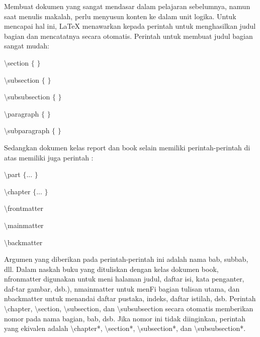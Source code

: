 Membuat dokumen yang sangat mendasar dalam pelajaran sebelumnya, namun saat menulis makalah, perlu menyusun konten ke dalam unit logika. Untuk mencapai hal ini, LaTeX menawarkan kepada perintah untuk menghasilkan judul bagian dan mencatatnya secara otomatis. Perintah untuk membuat judul bagian sangat mudah: \par
{\fontsize{10pt}{10pt}\selectfont  $  \setminus  $section $  \{  $ $  \}  $}
 \par
{\fontsize{10pt}{10pt}\selectfont  $  \setminus  $subsection $  \{  $ $  \}  $}
 \par
{\fontsize{10pt}{10pt}\selectfont  $  \setminus  $subsubsection $  \{  $ $  \}  $}
 \par
{\fontsize{10pt}{10pt}\selectfont  $  \setminus  $paragraph $  \{  $ $  \}  $}
 \par
{\fontsize{10pt}{10pt}\selectfont  $  \setminus  $subparagraph $  \{  $ $  \}  $}
 \par
\vspace{10pt}
Sedangkan dokumen kelas report dan book selain memiliki perintah-perintah di atas memiliki juga perintah :
 \par
\vspace{10pt}
{\fontsize{10pt}{10pt}\selectfont  $  \setminus  $part $  \{  $... $  \}  $}
 \par
\vspace{9pt}
{\fontsize{10pt}{10pt}\selectfont  $  \setminus  $chapter $  \{  $... $  \}  $}
 \par
\vspace{9pt}
{\fontsize{10pt}{10pt}\selectfont  $  \setminus  $frontmatter}
 \par
\vspace{9pt}
{\fontsize{10pt}{10pt}\selectfont  $  \setminus  $mainmatter}
 \par
\vspace{9pt}
{\fontsize{10pt}{10pt}\selectfont  $  \setminus  $backmatter}
 \par
\vspace{10pt}
Argumen yang diberikan pada perintah-perintah ini adalah nama bab, subbab, dll. Dalam naskah buku yang dituliskan dengan kelas dokumen book, nfronmatter digunakan untuk meni halaman judul, daftar isi, kata penganter, daf-tar gambar, dsb.), nmainmatter untuk menFi bagian tulisan utama, dan nbackmatter untuk menandai daftar pustaka, indeks, daftar istilah, dsb. Perintah  $  \setminus  $chapter,  $  \setminus  $section,  $  \setminus  $subsection, dan  $  \setminus  $subsubsection secara otomatis memberikan nomor pada nama bagian, bab, dsb. Jika nomor ini tidak diinginkan, perintah yang ekivalen adalah  $  \setminus  $chapter*,  $  \setminus  $section*,  $  \setminus  $subsection*, dan  $  \setminus  $subsubsection*.
